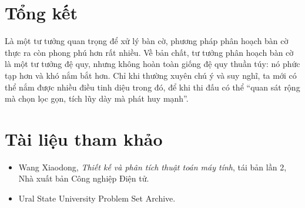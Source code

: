 \documentclass[11pt]{article}
\begin{document}
\section{Tổng kết}

Là một tư tưởng quan trọng để xử lý bàn cờ, phương pháp phân hoạch bàn cờ thực
ra còn phong phú hơn rất nhiều. Về bản chất, tư tưởng phân hoạch bàn cờ là một
tư tưởng đệ quy, nhưng không hoàn toàn giống đệ quy thuần túy: nó phức tạp hơn
và khó nắm bắt hơn. Chỉ khi thường xuyên chú ý và suy nghĩ, ta mới có thể nắm
được nhiều điều tinh diệu trong đó, để khi thi đấu có thể ``quan sát rộng mà
chọn lọc gọn, tích lũy dày mà phát huy mạnh''.

\section*{Tài liệu tham khảo}

\begin{itemize}
  \item Wang Xiaodong, \textit{Thiết kế và phân tích thuật toán máy tính},
  tái bản lần 2, Nhà xuất bản Công nghiệp Điện tử.
  \item Ural State University Problem Set Archive.
\end{itemize}
\end{document}

